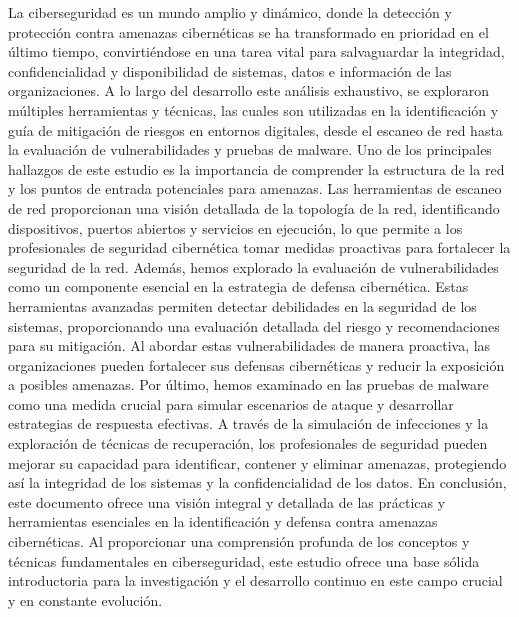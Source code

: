 \documentclass[stu, 11pt, letterpaper, donotrepeattitle, floatsintext, natbib]{apa7}
\begin{document}
La ciberseguridad es un mundo amplio y dinámico, donde la detección y protección contra amenazas cibernéticas se ha transformado en prioridad en el último tiempo, convirtiéndose en una tarea vital para salvaguardar la integridad, confidencialidad y disponibilidad de sistemas, datos e información de las organizaciones. A lo largo del desarrollo este análisis exhaustivo, se exploraron múltiples herramientas y técnicas, las cuales son utilizadas en la identificación y guía de mitigación de riesgos en entornos digitales, desde el escaneo de red hasta la evaluación de vulnerabilidades y pruebas de malware. 
Uno de los principales hallazgos de este estudio es la importancia de comprender la estructura de la red y los puntos de entrada potenciales para amenazas. Las herramientas de escaneo de red proporcionan una visión detallada de la topología de la red, identificando dispositivos, puertos abiertos y servicios en ejecución, lo que permite a los profesionales de seguridad cibernética tomar medidas proactivas para fortalecer la seguridad de la red. 
Además, hemos explorado la evaluación de vulnerabilidades como un componente esencial en la estrategia de defensa cibernética. Estas herramientas avanzadas permiten detectar debilidades en la seguridad de los sistemas, proporcionando una evaluación detallada del riesgo y recomendaciones para su mitigación. Al abordar estas vulnerabilidades de manera proactiva, las organizaciones pueden fortalecer sus defensas cibernéticas y reducir la exposición a posibles amenazas. 
Por último, hemos examinado en las pruebas de malware como una medida crucial para simular escenarios de ataque y desarrollar estrategias de respuesta efectivas. A través de la simulación de infecciones y la exploración de técnicas de recuperación, los profesionales de seguridad pueden mejorar su capacidad para identificar, contener y eliminar amenazas, protegiendo así la integridad de los sistemas y la confidencialidad de los datos. 
En conclusión, este documento ofrece una visión integral y detallada de las prácticas y herramientas esenciales en la identificación y defensa contra amenazas cibernéticas. Al proporcionar una comprensión profunda de los conceptos y técnicas fundamentales en ciberseguridad, este estudio ofrece una base sólida introductoria para la investigación y el desarrollo continuo en este campo crucial y en constante evolución.


\newpage
\renewcommand\refname{\large\textbf{Referencias}}

\end{document}

